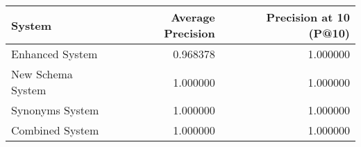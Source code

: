 \begin{tabular}{lrr}
\toprule
System & Average Precision & Precision at 10 (P@10) \\
\midrule
Enhanced System & 0.968378 & 1.000000 \\
New Schema System & 1.000000 & 1.000000 \\
Synonyms System & 1.000000 & 1.000000 \\
Combined System & 1.000000 & 1.000000 \\
\bottomrule
\end{tabular}
